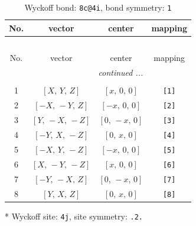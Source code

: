 \documentclass[fleqn,8pt]{jsarticle}
\begin{document}
\renewcommand{\arraystretch}{1.2}
\begin{longtable}{cccc}
\caption{Wyckoff bond: {\tt 8c@4i}, bond symmetry: {\tt 1}}
 \\
 \hline \hline
No. & vector & center & mapping \\ \hline \endfirsthead

\multicolumn{3}{l}{\tablename\ \thetable{}} \\
 \hline \hline
No. & vector & center & mapping \\ \hline \endhead

 \hline \hline
\multicolumn{3}{r}{\footnotesize\it continued ...} \\ \endfoot

 \hline \hline
\multicolumn{3}{r}{} \\ \endlastfoot

1 & $\left[ X,\, Y,\, Z \right]$ & $\left[ x,\, 0,\, 0 \right]$ & {\tt [1]} \\ \hline
2 & $\left[ - X,\, - Y,\, Z \right]$ & $\left[ - x,\, 0,\, 0 \right]$ & {\tt [2]} \\ \hline
3 & $\left[ Y,\, - X,\, - Z \right]$ & $\left[ 0,\, - x,\, 0 \right]$ & {\tt [3]} \\ \hline
4 & $\left[ - Y,\, X,\, - Z \right]$ & $\left[ 0,\, x,\, 0 \right]$ & {\tt [4]} \\ \hline
5 & $\left[ - X,\, Y,\, - Z \right]$ & $\left[ - x,\, 0,\, 0 \right]$ & {\tt [5]} \\ \hline
6 & $\left[ X,\, - Y,\, - Z \right]$ & $\left[ x,\, 0,\, 0 \right]$ & {\tt [6]} \\ \hline
7 & $\left[ - Y,\, - X,\, Z \right]$ & $\left[ 0,\, - x,\, 0 \right]$ & {\tt [7]} \\ \hline
8 & $\left[ Y,\, X,\, Z \right]$ & $\left[ 0,\, x,\, 0 \right]$ & {\tt [8]} \\
\end{longtable}
* Wyckoff site: {\tt 4j}, site symmetry: {\tt .2.}
\renewcommand{\arraystretch}{1.2}
\end{document}

